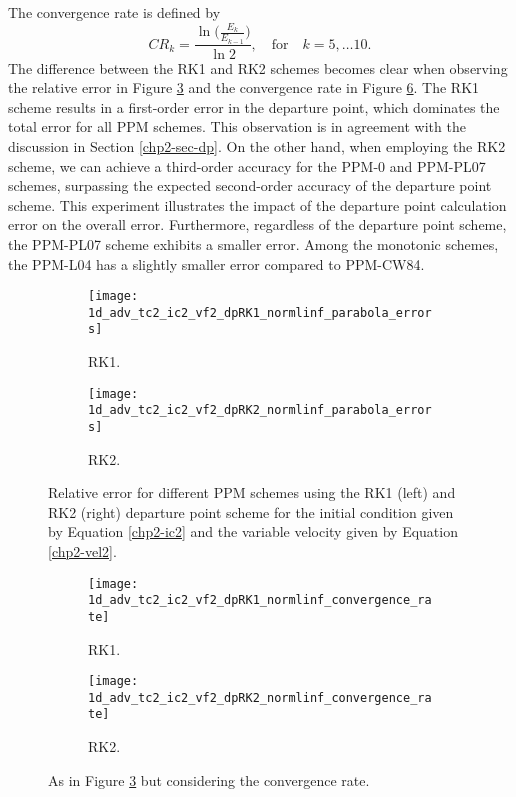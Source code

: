 The convergence rate is defined by
\begin{equation*}
	CR_k = \frac{\ln{\bigg(\frac{E_{k}}{E_{k-1}}}\bigg)}{\ln 2}, \quad \text{for} \quad k = 5, \ldots 10.
\end{equation*}
The difference between the RK1 and RK2 schemes becomes clear when observing the relative error in Figure \ref{chp2-sec-exp-adv2-2} and the convergence rate in Figure
\ref{chp2-sec-exp-adv2-3}.
The RK1 scheme results in a first-order error in the departure point, which dominates the total error for all PPM schemes.
This observation is in agreement with the discussion in Section \ref{chp2-sec-dp}.
On the other hand, when employing the RK2 scheme, we can achieve a third-order accuracy for the PPM-0 and PPM-PL07 schemes,
surpassing the expected second-order accuracy of the departure point scheme.
This experiment illustrates the impact of the departure point calculation error on the
overall error.
Furthermore, regardless of the departure point scheme, the PPM-PL07 scheme exhibits a smaller error.
Among the monotonic schemes, the PPM-L04 has a slightly smaller error compared to PPM-CW84.
\begin{figure}[!htb]
	\centering
	\begin{subfigure}{0.45\textwidth}
		\centering
		\texttt{[image: 1d\_adv\_tc2\_ic2\_vf2\_dpRK1\_normlinf\_parabola\_errors]}
		\caption{RK1.\label{chp2-sec-exp-adv2-error-rk1}}
	\end{subfigure}
	\begin{subfigure}{0.45\textwidth}
		\centering
		\texttt{[image: 1d\_adv\_tc2\_ic2\_vf2\_dpRK2\_normlinf\_parabola\_errors]}
		\caption{RK2.\label{chp2-sec-exp-adv2-rk3}}
	\end{subfigure}
	\caption{Relative error for different PPM schemes using the RK1 (left) and RK2 (right)
		departure point scheme for the initial condition given by Equation
		\eqref{chp2-ic2} and the variable 
		velocity given by Equation \eqref{chp2-vel2}.\label{chp2-sec-exp-adv2-2}}
\end{figure}

\begin{figure}[!htb]
	\centering
	\begin{subfigure}{0.45\textwidth}
		\centering
		\texttt{[image: 1d\_adv\_tc2\_ic2\_vf2\_dpRK1\_normlinf\_convergence\_rate]}
		\caption{RK1.\label{chp2-sec-exp-adv2-cr-rk1}}
	\end{subfigure}
	\begin{subfigure}{0.45\textwidth}
		\centering
		\texttt{[image: 1d\_adv\_tc2\_ic2\_vf2\_dpRK2\_normlinf\_convergence\_rate]}
		\caption{RK2.\label{chp2-sec-exp-adv2-cf-rk2}}
	\end{subfigure}
	\caption{As in Figure \ref{chp2-sec-exp-adv2-2} but considering the convergence rate. \label{chp2-sec-exp-adv2-3}}
\end{figure}

